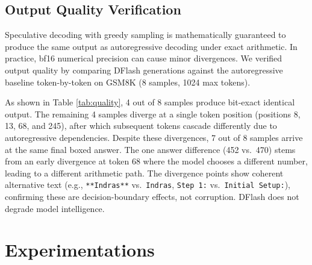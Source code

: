 \documentclass[12pt,letterpaper]{article}
\begin{document}
\begin{table}[htbp]
\caption{V5P vs.\ GPU paper (math datasets).}
\label{tab:v5p_gpu}
\resizebox{0.8\linewidth}{!}{}
\end{table}

\begin{table}[htbp]
\caption{V5P vs.\ V4 standalone.}
\label{tab:v5p_v4}
\resizebox{\linewidth}{!}{}
\end{table}

\subsection{Output Quality Verification}

Speculative decoding with greedy sampling is mathematically guaranteed to produce the same output as autoregressive decoding under exact arithmetic. In practice, bf16 numerical precision can cause minor divergences. We verified output quality by comparing DFlash generations against the autoregressive baseline token-by-token on GSM8K (8 samples, 1024 max tokens).

\begin{table}[htbp]
\caption{Output quality check on GSM8K. 4/8 samples produce bit-exact identical output; 7/8 arrive at the same final $\backslash$\texttt{boxed\{\}} math answer. Divergences occur at random positions where top-2 logits are close, consistent with bf16 precision effects.}
\label{tab:quality}
\resizebox{\linewidth}{!}{}
\end{table}

As shown in Table \ref{tab:quality}, 4 out of 8 samples produce bit-exact identical output. The remaining 4 samples diverge at a single token position (positions 8, 13, 68, and 245), after which subsequent tokens cascade differently due to autoregressive dependencies. Despite these divergences, 7 out of 8 samples arrive at the same final boxed answer. The one answer difference (452 vs.\ 470) stems from an early divergence at token 68 where the model chooses a different number, leading to a different arithmetic path. The divergence points show coherent alternative text (e.g., \texttt{**Indras**} vs.\ \texttt{Indras}, \texttt{Step 1:} vs.\ \texttt{Initial Setup:}), confirming these are decision-boundary effects, not corruption. DFlash does not degrade model intelligence.


\section{Experimentations}
\label{sec:experimentations}
\end{document}
